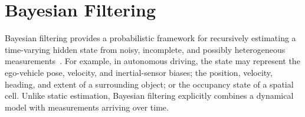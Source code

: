 %
%
%
%



\section{Bayesian Filtering}
\label{sec:bayes-filtering}
%



Bayesian filtering provides a probabilistic framework for recursively estimating a time-varying hidden state from noisy, incomplete, and possibly heterogeneous measurements~\cite{sarkka2013_bayesian}. For example, in autonomous driving, the state may represent the ego-vehicle pose, velocity, and inertial-sensor biases; the position, velocity, heading, and extent of a surrounding object; or the occupancy state of a spatial cell. Unlike static estimation, Bayesian filtering explicitly combines a dynamical model with measurements arriving over time.

